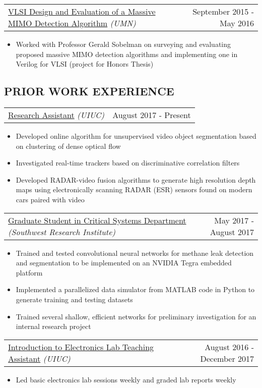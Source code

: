 \documentclass[10pt, letterpaper]{article}
\makeatletter
\newcommand{\headerrow}[2]
{\begin{tabular*}{\linewidth}{l@{\extracolsep{\fill}}r}
	#1 &
	#2 \\
\end{tabular*}}
\newcommand{\sansserif}{\cabin}
\makeatother
\begin{document}
\headerrow
	{\uline{VLSI Design and Evaluation of a Massive MIMO Detection Algorithm} \textit{(UMN)}}
	{September 2015 - May 2016}
	\begin{itemize}
		\item
		Worked with Professor Gerald Sobelman on surveying and evaluating proposed massive MIMO detection algorithms and implementing one in Verilog for VLSI (project for Honors Thesis) 
	\end{itemize}

\subsection*{\sansserif PRIOR WORK EXPERIENCE}

\headerrow
	{\uline{Research Assistant} \textit{(UIUC)}}
	{August 2017 - Present}
	\begin{itemize}
		\item Developed online algorithm for unsupervised video object segmentation based on clustering of dense optical flow
		\item Investigated real-time trackers based on discriminative correlation filters
        \item Developed RADAR-video fusion algorithms to generate high
resolution depth maps using electronically scanning RADAR (ESR) sensors found on
modern cars paired with video
	\end{itemize}

\headerrow
	{\uline{Graduate Student in Critical Systems Department} \textit{(Southwest Research Institute)}}
	{May 2017 - August 2017}
	\begin{itemize}
		\item Trained and tested convolutional neural networks for methane leak detection and segmentation to be implemented on an NVIDIA Tegra embedded platform
		\item Implemented a parallelized data simulator from MATLAB code in Python to generate training and testing datasets
		\item Trained several shallow, efficient networks for preliminary investigation for an internal research project
	\end{itemize}

\headerrow
	{\uline{Introduction to Electronics Lab Teaching Assistant} \textit{(UIUC)}}
	{August 2016 - December 2017}
	\begin{itemize}
		\item Led basic electronics lab sessions weekly and graded lab reports weekly
	\end{itemize}
\end{document}
